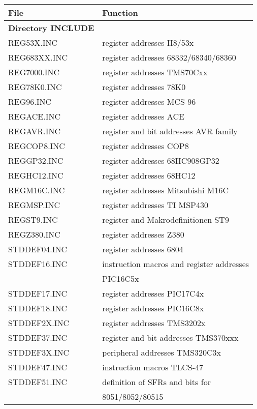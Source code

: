 \documentclass[12pt,twoside]{report}
\begin{document}
\begin{table*}[htp]
\begin{center}\begin{tabular}{|l|l|}
\hline
File              & Function \\
\hline
\hline
{\bf Directory INCLUDE} & \\
\hline
REG53X.INC        & register addresses H8/53x \\
REG683XX.INC      & register addresses 68332/68340/68360 \\
REG7000.INC       & register addresses TMS70Cxx \\
REG78K0.INC       & register addresses 78K0 \\
REG96.INC         & register addresses MCS-96 \\
REGACE.INC        & register addresses ACE \\
REGAVR.INC        & register and bit addresses AVR family \\
REGCOP8.INC       & register addresses COP8 \\
REGGP32.INC       & register addresses 68HC908GP32 \\
REGHC12.INC       & register addresses 68HC12 \\
REGM16C.INC       & register addresses Mitsubishi M16C \\
REGMSP.INC        & register addresses TI MSP430 \\
REGST9.INC        & register and Makrodefinitionen ST9 \\
REGZ380.INC       & register addresses Z380 \\
STDDEF04.INC      & register addresses 6804 \\
STDDEF16.INC      & instruction macros and register addresses \\
                  & PIC16C5x \\
STDDEF17.INC      & register addresses PIC17C4x \\
STDDEF18.INC      & register addresses PIC16C8x \\
STDDEF2X.INC      & register addresses TMS3202x \\
STDDEF37.INC      & register and bit addresses TMS370xxx \\
STDDEF3X.INC      & peripheral addresses TMS320C3x \\
STDDEF47.INC      & instruction macros TLCS-47 \\
STDDEF51.INC      & definition of SFRs and bits for \\
                  & 8051/8052/80515 \\

\end{tabular}
\end{center}
\end{table*}
\end{document}
